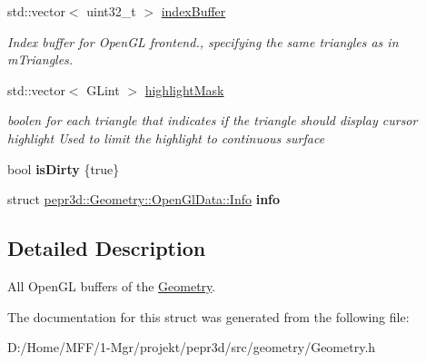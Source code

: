 \begin{DoxyCompactItemize}
std\+::vector$<$ uint32\+\_\+t $>$ \mbox{\hyperlink{structpepr3d_1_1_geometry_1_1_open_gl_data_ad66b73ae688939f518a57411a9f02671}{index\+Buffer}}
\begin{DoxyCompactList}\small\item\em Index buffer for Open\+GL frontend., specifying the same triangles as in m\+Triangles. \end{DoxyCompactList}\item 
\mbox{\label{structpepr3d_1_1_geometry_1_1_open_gl_data_a8c61b7f1139d0a7fa632ab221546e81b}} 
std\+::vector$<$ G\+Lint $>$ \mbox{\hyperlink{structpepr3d_1_1_geometry_1_1_open_gl_data_a8c61b7f1139d0a7fa632ab221546e81b}{highlight\+Mask}}
\begin{DoxyCompactList}\small\item\em boolen for each triangle that indicates if the triangle should display cursor highlight Used to limit the highlight to continuous surface \end{DoxyCompactList}\item 
\mbox{\label{structpepr3d_1_1_geometry_1_1_open_gl_data_ab219bc2425e6580d0667d3165b9c660b}} 
bool {\bfseries is\+Dirty} \{true\}
\item 
\mbox{\label{structpepr3d_1_1_geometry_1_1_open_gl_data_a1960dd95c0c38dda4a26422de4c981b4}} 
struct \mbox{\hyperlink{structpepr3d_1_1_geometry_1_1_open_gl_data_1_1_info}{pepr3d\+::\+Geometry\+::\+Open\+Gl\+Data\+::\+Info}} {\bfseries info}
\end{DoxyCompactItemize}


\subsection{Detailed Description}
All Open\+GL buffers of the \mbox{\hyperlink{classpepr3d_1_1_geometry}{Geometry}}. 

The documentation for this struct was generated from the following file\+:\begin{DoxyCompactItemize}
\item 
D\+:/\+Home/\+M\+F\+F/1-\/\+Mgr/projekt/pepr3d/src/geometry/Geometry.\+h\end{DoxyCompactItemize}
